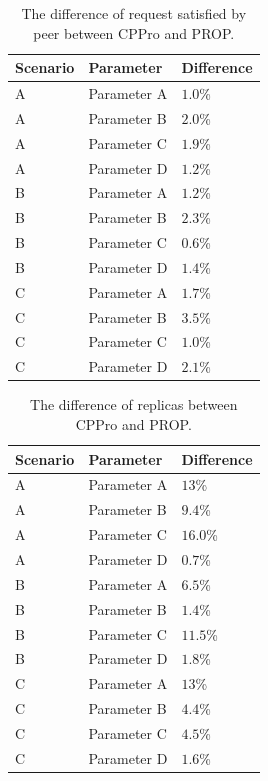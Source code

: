 \documentclass[10pt,final,journal,a4paper]{IEEEtran}
\begin{document}
\begin{table}[!t]
\caption{The difference of request satisfied by peer between CPPro and PROP.}
\label{tab:peercontributions}
\centering
\begin{tabular}{|l|l|l|}
\hline
Scenario & Parameter & Difference \\
\hline
A & Parameter A & $1.0$\%\\
\hline
A & Parameter B & $2.0$\%\\
\hline
A & Parameter C & $1.9$\%\\
\hline
A & Parameter D & $1.2$\%\\
\hline
B & Parameter A & $1.2$\%\\
\hline
B & Parameter B & $2.3$\%\\
\hline
B & Parameter C & $0.6$\%\\
\hline
B & Parameter D & $1.4$\%\\
\hline
C & Parameter A & $1.7$\%\\
\hline
C & Parameter B & $3.5$\%\\
\hline
C & Parameter C & $1.0$\%\\
\hline
C & Parameter D & $2.1$\%\\
\hline
\end{tabular}
\end{table}

\begin{table}[!t]
\caption{The difference of replicas between CPPro and PROP.}
\label{tab:replicas}
\centering
\begin{tabular}{|l|l|l|}
\hline
Scenario & Parameter & Difference \\
\hline
A & Parameter A & $13$\%\\
\hline
A & Parameter B & $9.4$\%\\
\hline
A & Parameter C & $16.0$\%\\
\hline
A & Parameter D & $0.7$\%\\
\hline
B & Parameter A & $6.5$\%\\
\hline
B & Parameter B & $1.4$\%\\
\hline
B & Parameter C & $11.5$\%\\
\hline
B & Parameter D & $1.8$\%\\
\hline
C & Parameter A & $13$\%\\
\hline
C & Parameter B & $4.4$\%\\
\hline
C & Parameter C & $4.5$\%\\
\hline
C & Parameter D & $1.6$\%\\
\hline
\end{tabular}
\end{table}
\end{document}
